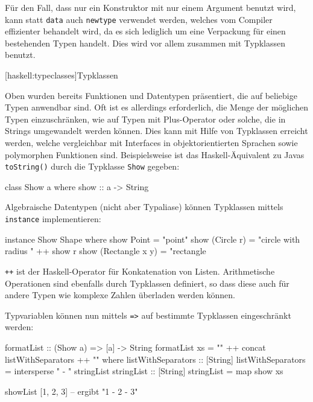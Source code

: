 \documentclass[12pt, a4paper, bibgerm]{scrbook}
\newenvironment{DIFnomarkup}{}{}
\newcommand\icode[1]{\lstinline?#1?}
\newcommand\lsection{}
\begin{document}
Für den Fall, dass nur ein Konstruktor mit nur einem Argument benutzt
wird, kann statt \icode{data} auch \icode{newtype} verwendet
werden, welches vom Compiler effizienter behandelt wird, da es sich
lediglich um eine Verpackung für einen bestehenden Typen handelt. Dies
wird vor allem zusammen mit Typklassen benutzt.

\lsection[haskell:typeclasses]{Typklassen}

Oben wurden bereits Funktionen und Datentypen präsentiert, die auf
beliebige Typen anwendbar sind. Oft ist es allerdings erforderlich, die
Menge der möglichen Typen einzuschränken, wie auf Typen mit
Plus-Operator oder solche, die in Strings umgewandelt werden
können. Dies kann mit Hilfe von Typklassen erreicht werden, welche
vergleichbar mit Interfaces in objektorientierten Sprachen sowie
polymorphen Funktionen sind. Beispielsweise ist das Haskell-Äquivalent
zu Javas \icode{toString()} durch die Typklasse \icode{Show} gegeben:
\begin{DIFnomarkup}\begin{code}
class Show a where
  show :: a -> String
\end{code}\end{DIFnomarkup}
Algebraische Datentypen (nicht aber Typaliase) können Typklassen mittels
\icode{instance} implementieren:
\begin{DIFnomarkup}\begin{code}
instance Show Shape where
  show Point           = "point"
  show (Circle r)      = "circle with radius " ++ show r
  show (Rectangle x y) = "rectangle
\end{code}\end{DIFnomarkup}
\icode{++} ist der Haskell-Operator für Konkatenation von Listen.
Arithmetische Operationen sind ebenfalls durch Typklassen definiert, so
dass diese auch für andere Typen wie komplexe Zahlen überladen werden
können.

Typvariablen können nun mittels \icode{=>} auf bestimmte Typklassen
eingeschränkt werden:
\begin{DIFnomarkup}\begin{code}
formatList :: (Show a) => [a] -> String
formatList xs = "{" ++ concat listWithSeparators ++ "}"
  where listWithSeparators :: [String]
        listWithSeparators = intersperse " - " stringList
        stringList :: [String]
        stringList = map show xs

showList [1, 2, 3] -- ergibt "{1 - 2 - 3}"
\end{code}\end{DIFnomarkup}
\end{document}

